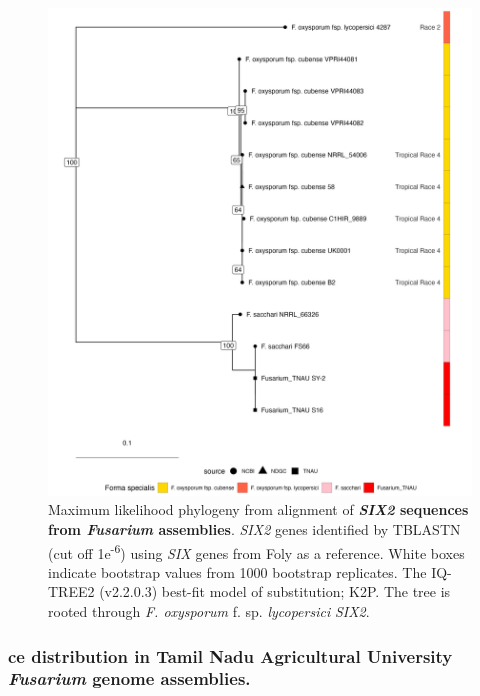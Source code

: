 \begin{figure}[htp!]
  \centering
  \includegraphics[width=\textwidth]{Figures/FusSIX2.phylo.png}
  \caption[Maximum likelihood phylogeny from alignment of \textit{SIX2} sequences from \textit{Fusarium} assemblies]{Maximum likelihood phylogeny from alignment of \textbf{\textit{SIX2} sequences from \textit{Fusarium} assemblies}. \textit{SIX2} genes identified by TBLASTN (cut off 1e\textsuperscript{-6}) using \textit{SIX} genes from \acl{Foly} as a reference. White boxes indicate bootstrap values from 1000 bootstrap replicates. The IQ-TREE2 (v2.2.0.3) best-fit model of substitution;  K2P. The tree is rooted through \textit{F. oxysporum} f. sp. \textit{lycopersici} \textit{SIX2}.}
  \label{fig:FusSIX2}
\end{figure}

\subsubsection{\Acl{ce} distribution in Tamil Nadu Agricultural University \textit{Fusarium} genome assemblies.}
\label{tnauCEs}

